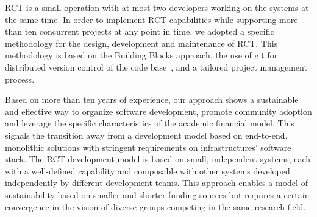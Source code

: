 \documentclass[preprint,12pt, a4paper]{elsarticle}
\begin{document}
RCT is a small operation with at most two developers working on the systems at
the same time. In order to implement RCT capabilities while supporting more than
ten concurrent projects at any point in time, we adopted a specific methodology
for the design, development and maintenance of RCT\@. This methodology is based
on the Building Blocks approach, the use of git for distributed version control
of the code base~\cite{github-rct}, and a tailored project management process.

Based on more than ten years of experience, our approach shows a sustainable and
effective way to organize software development, promote community adoption and
leverage the specific characteristics of the academic financial model. This
signals the transition away from a development model based on end-to-end,
monolithic solutions with stringent requirements on infrastructures' software
stack. The RCT development model is based on small, independent systems, each
with a well-defined capability and composable with other systems developed
independently by different development teams. This approach enables a model of
sustainability based on smaller and shorter funding sources but requires a
certain convergence in the vision of diverse groups competing in the same
research field.


\end{document}
